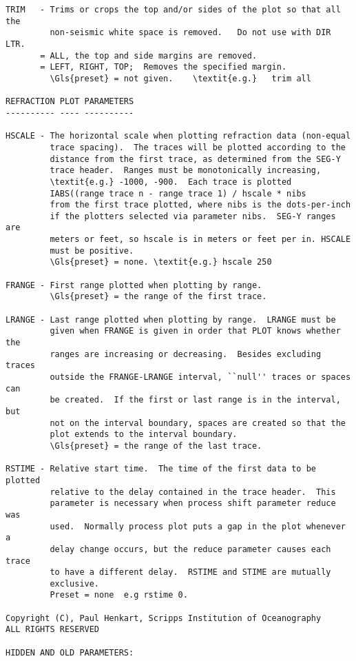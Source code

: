 \begin{verbatim}
TRIM   - Trims or crops the top and/or sides of the plot so that all the
         non-seismic white space is removed.   Do not use with DIR LTR.
       = ALL, the top and side margins are removed.
       = LEFT, RIGHT, TOP;  Removes the specified margin.
         \Gls{preset} = not given.    \textit{e.g.}   trim all

REFRACTION PLOT PARAMETERS
---------- ---- ----------

HSCALE - The horizontal scale when plotting refraction data (non-equal
         trace spacing).  The traces will be plotted according to the
         distance from the first trace, as determined from the SEG-Y
         trace header.  Ranges must be monotonically increasing,
         \textit{e.g.} -1000, -900.  Each trace is plotted
         IABS((range trace n - range trace 1) / hscale * nibs
         from the first trace plotted, where nibs is the dots-per-inch
         if the plotters selected via parameter nibs.  SEG-Y ranges are
         meters or feet, so hscale is in meters or feet per in. HSCALE
         must be positive.
         \Gls{preset} = none. \textit{e.g.} hscale 250

FRANGE - First range plotted when plotting by range.
         \Gls{preset} = the range of the first trace.

LRANGE - Last range plotted when plotting by range.  LRANGE must be
         given when FRANGE is given in order that PLOT knows whether the
         ranges are increasing or decreasing.  Besides excluding traces
         outside the FRANGE-LRANGE interval, ``null'' traces or spaces can
         be created.  If the first or last range is in the interval, but
         not on the interval boundary, spaces are created so that the
         plot extends to the interval boundary.
         \Gls{preset} = the range of the last trace.

RSTIME - Relative start time.  The time of the first data to be plotted
         relative to the delay contained in the trace header.  This
         parameter is necessary when process shift parameter reduce was
         used.  Normally process plot puts a gap in the plot whenever a
         delay change occurs, but the reduce parameter causes each trace
         to have a different delay.  RSTIME and STIME are mutually
         exclusive.
         Preset = none  e.g rstime 0.

Copyright (C), Paul Henkart, Scripps Institution of Oceanography
ALL RIGHTS RESERVED

HIDDEN AND OLD PARAMETERS:


\end{verbatim}
